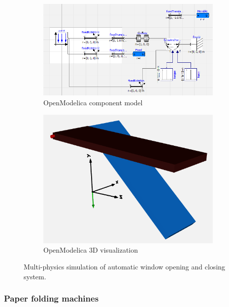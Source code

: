 \documentclass{PDS}
\begin{document}
\begin{figure}[htbp]
    \begin{subfigure}[b]{0.575\textwidth}
        \includegraphics[width=\textwidth]{./figures/glasshouse_mechatronic_1.png}
        \caption{OpenModelica component model}
        \label{fig:glasshouse-sim-1}
    \end{subfigure}
    \hfill
    \begin{subfigure}[b]{0.41\textwidth}
        \includegraphics[width=\textwidth]{./figures/glasshouse_mechatronic_2.png}
        \caption{OpenModelica 3D visualization}
        \label{fig:glasshouse-sim-2}
    \end{subfigure}
    \caption{Multi-physics simulation of automatic window opening and closing system.}
    \label{fig:glasshouse-sim}
\end{figure}


\subsubsection{Paper folding machines}
\label{sec:master-system-lego}
\end{document}
